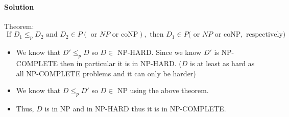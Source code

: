 \documentclass[10pt]{article}
\begin{document}
\paragraph{Solution} 

\color{Red}
Theorem: $$
    \text { If } D_{1} \leq_{p} D_{2} \text { and } D_{2} \in P(\text { or } N P \text { or } \mathrm{coNP}), \text { then } D_{1} \in P(\text { or } N P \text { or } \mathrm{coNP},\text { respectively) } $$ \color{Black}
\begin{itemize}
    \item We know that $D'\leq_p D$ so $D\in $ NP-HARD. Since we know $D'$ is NP-COMPLETE then in particular it is in NP-HARD. ($D$ is at least as hard as all NP-COMPLETE problems and it can only be harder)
    \item We know that $D\leq_p D'$ so $D\in$ NP using the above theorem.
    \item Thus, $D$ is in NP and in NP-HARD thus it is in NP-COMPLETE.
\end{itemize}
\end{document}
